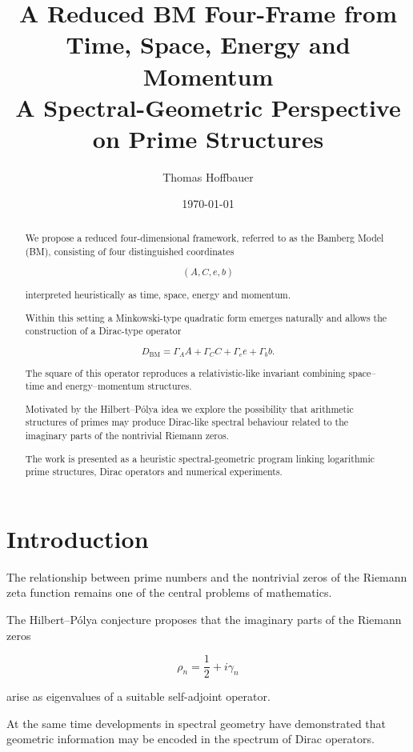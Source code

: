 \documentclass[11pt,a4paper]{article}
\title{
	A Reduced BM Four-Frame from Time, Space, Energy and Momentum \\
	\large A Spectral-Geometric Perspective on Prime Structures
}
\author{Thomas Hoffbauer}
\date{\today}
\begin{document}
	
	\maketitle
	
	\begin{abstract}
		
		We propose a reduced four-dimensional framework,
		referred to as the Bamberg Model (BM), consisting of four
		distinguished coordinates
		
		\[
		(A,C,e,b)
		\]
		
		interpreted heuristically as time, space, energy and momentum.
		
		Within this setting a Minkowski-type quadratic form
		emerges naturally and allows the construction of a
		Dirac-type operator
		
		\[
		D_{\mathrm{BM}}=
		\Gamma_A A+
		\Gamma_C C+
		\Gamma_e e+
		\Gamma_b b .
		\]
		
		The square of this operator reproduces a relativistic-like
		invariant combining space–time and energy–momentum
		structures.
		
		Motivated by the Hilbert–Pólya idea we explore the possibility
		that arithmetic structures of primes may produce
		Dirac-like spectral behaviour related to the imaginary
		parts of the nontrivial Riemann zeros.
		
		The work is presented as a heuristic spectral-geometric
		program linking logarithmic prime structures,
		Dirac operators and numerical experiments.
		
	\end{abstract}
	
	\tableofcontents
	
	\section{Introduction}
	
	The relationship between prime numbers and the
	nontrivial zeros of the Riemann zeta function remains one of
	the central problems of mathematics.
	
	The Hilbert–Pólya conjecture proposes that the imaginary
	parts of the Riemann zeros
	
	\[
	\rho_n=\frac12+i\gamma_n
	\]
	
	arise as eigenvalues of a suitable self-adjoint operator.
	
	At the same time developments in spectral geometry have
	demonstrated that geometric information may be encoded
	in the spectrum of Dirac operators.
	
\end{document}
